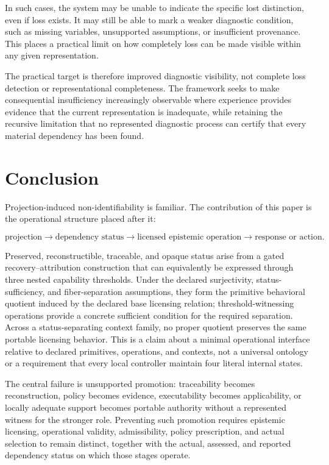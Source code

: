\documentclass[11pt]{article}
\theoremstyle{definition}
\theoremstyle{remark}
\begin{document}
In such cases, the system may be unable to indicate the specific lost distinction, even if loss exists. It may still be able to mark a weaker diagnostic condition, such as missing variables, unsupported assumptions, or insufficient provenance. This places a practical limit on how completely loss can be made visible within any given representation.

The practical target is therefore improved diagnostic visibility, not complete loss detection or representational completeness. The framework seeks to make consequential insufficiency increasingly observable where experience provides evidence that the current representation is inadequate, while retaining the recursive limitation that no represented diagnostic process can certify that every material dependency has been found.

\section{Conclusion}

Projection-induced non-identifiability is familiar. The contribution of this paper is the operational structure placed after it:

\[
\boxed{
\text{projection}
\rightarrow
\text{dependency status}
\rightarrow
\text{licensed epistemic operation}
\rightarrow
\text{response or action}.
}
\]

Preserved, reconstructible, traceable, and opaque status arise from a gated recovery--attribution construction that can equivalently be expressed through three nested capability thresholds. Under the declared surjectivity, status-sufficiency, and fiber-separation assumptions, they form the primitive behavioral quotient induced by the declared base licensing relation; threshold-witnessing operations provide a concrete sufficient condition for the required separation. Across a status-separating context family, no proper quotient preserves the same portable licensing behavior. This is a claim about a minimal operational interface relative to declared primitives, operations, and contexts, not a universal ontology or a requirement that every local controller maintain four literal internal states.

The central failure is unsupported promotion: traceability becomes reconstruction, policy becomes evidence, executability becomes applicability, or locally adequate support becomes portable authority without a represented witness for the stronger role. Preventing such promotion requires epistemic licensing, operational validity, admissibility, policy prescription, and actual selection to remain distinct, together with the actual, assessed, and reported dependency status on which those stages operate.
\end{document}
